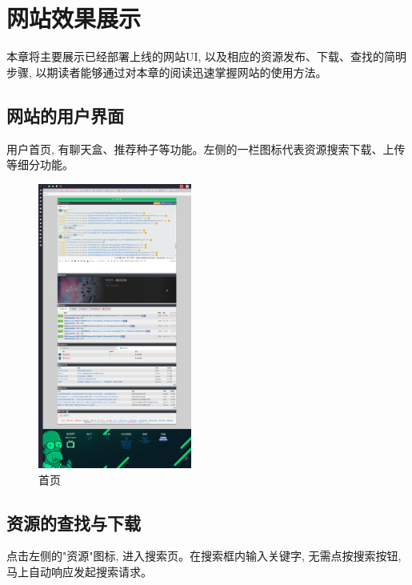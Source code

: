\chapter{网站效果展示}

本章将主要展示已经部署上线的网站UI, 以及相应的资源发布、下载、查找的简明步骤, 以期读者能够通过对本章的阅读迅速掌握网站的使用方法。

\section{网站的用户界面}

用户首页, 有聊天盒、推荐种子等功能。左侧的一栏图标代表资源搜索下载、上传等细分功能。

\begin{figure}[h]
    \centering
    \includegraphics[width=0.45\textwidth]{support-files/5.1-index-ui.png}
    \caption{首页}
    \label{fig:webindex}
\end{figure}

\section{资源的查找与下载}

点击左侧的"资源"图标, 进入搜索页。在搜索框内输入关键字, 无需点按搜索按钮, 马上自动响应发起搜索请求。

